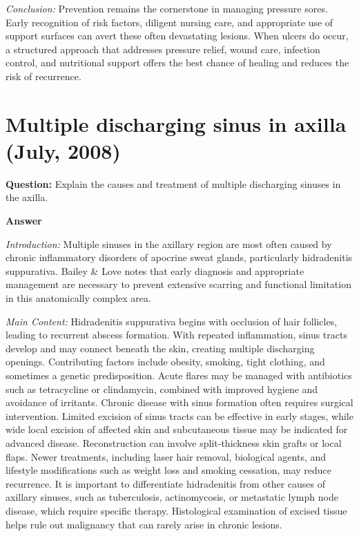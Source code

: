\documentclass{article}
\begin{document}
\emph{Conclusion:} Prevention remains the cornerstone in managing pressure sores. Early recognition of risk factors, diligent nursing care, and appropriate use of support surfaces can avert these often devastating lesions. When ulcers do occur, a structured approach that addresses pressure relief, wound care, infection control, and nutritional support offers the best chance of healing and reduces the risk of recurrence.


\section{Multiple discharging sinus in axilla (July, 2008)}


\textbf{Question:} Explain the causes and treatment of multiple discharging sinuses in the axilla.

\textbf{Answer}

\emph{Introduction:} Multiple sinuses in the axillary region are most often caused by chronic inflammatory disorders of apocrine sweat glands, particularly hidradenitis suppurativa. Bailey \& Love notes that early diagnosis and appropriate management are necessary to prevent extensive scarring and functional limitation in this anatomically complex area.

\emph{Main Content:} Hidradenitis suppurativa begins with occlusion of hair follicles, leading to recurrent abscess formation. With repeated inflammation, sinus tracts develop and may connect beneath the skin, creating multiple discharging openings. Contributing factors include obesity, smoking, tight clothing, and sometimes a genetic predisposition. Acute flares may be managed with antibiotics such as tetracycline or clindamycin, combined with improved hygiene and avoidance of irritants. Chronic disease with sinus formation often requires surgical intervention. Limited excision of sinus tracts can be effective in early stages, while wide local excision of affected skin and subcutaneous tissue may be indicated for advanced disease. Reconstruction can involve split-thickness skin grafts or local flaps. Newer treatments, including laser hair removal, biological agents, and lifestyle modifications such as weight loss and smoking cessation, may reduce recurrence. It is important to differentiate hidradenitis from other causes of axillary sinuses, such as tuberculosis, actinomycosis, or metastatic lymph node disease, which require specific therapy. Histological examination of excised tissue helps rule out malignancy that can rarely arise in chronic lesions.
\end{document}
